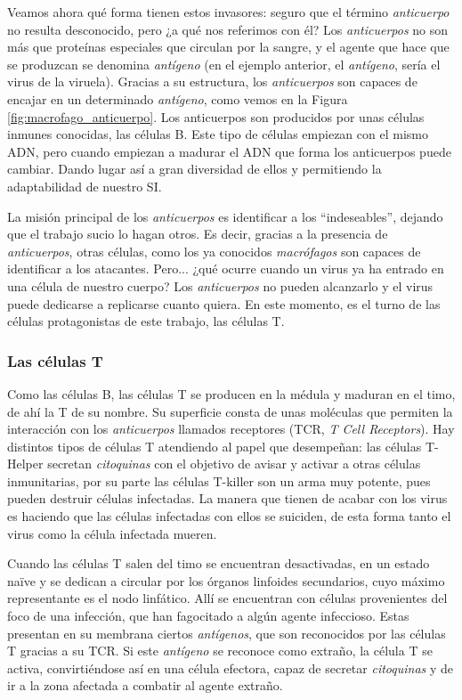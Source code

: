 Veamos ahora qué forma tienen estos invasores: seguro que el término \textit{anticuerpo} no resulta desconocido, pero ¿a qué nos referimos con él? Los \textit{anticuerpos} no son más que proteínas especiales que circulan por la sangre, y el agente que hace que se produzcan se denomina \textit{antígeno} (en el ejemplo anterior, el \textit{antígeno}, sería el virus de la viruela). Gracias a su estructura, los \textit{anticuerpos} son capaces de encajar en un determinado \textit{antígeno}, como vemos en la Figura \ref{fig:macrofago_anticuerpo}. Los anticuerpos son producidos por unas células inmunes conocidas, las células B. Este tipo de células empiezan con el mismo ADN, pero cuando empiezan a madurar el ADN que forma los anticuerpos puede cambiar. Dando lugar así a gran diversidad de ellos y permitiendo la adaptabilidad de nuestro SI.

La misión principal de los \textit{anticuerpos} es identificar a los ``indeseables'', dejando que el trabajo sucio lo hagan otros. Es decir, gracias a la presencia de \textit{anticuerpos}, otras células, como los ya conocidos \textit{macrófagos} son capaces de identificar a los atacantes. Pero... ¿qué ocurre cuando un virus ya ha entrado en una célula de nuestro cuerpo? Los \textit{anticuerpos} no pueden alcanzarlo y el virus puede dedicarse a replicarse cuanto quiera. En este momento, es el turno de las células protagonistas de este trabajo, las células T. 

\subsubsection{Las células T}
Como las células B, las células T se producen en la médula y maduran en el timo, de ahí la T de su nombre. Su superficie consta de unas moléculas que permiten la interacción con los \textit{anticuerpos} llamados receptores (TCR, \textit{T Cell Receptors}). Hay distintos tipos de células T atendiendo al papel que desempeñan: las células T-Helper secretan \textit{citoquinas} con el objetivo de avisar y activar a otras células inmunitarias, por su parte las células T-killer son un arma muy potente, pues pueden destruir células infectadas. La manera que tienen de acabar con los virus es haciendo que las células infectadas con ellos se suiciden, de esta forma tanto el virus como la célula infectada mueren.

Cuando las células T salen del timo se encuentran desactivadas, en un estado naïve y se dedican a circular por los órganos linfoides secundarios, cuyo máximo representante es el nodo linfático. Allí se encuentran con células provenientes del foco de una infección, que han fagocitado a algún agente infeccioso. Estas presentan en su membrana ciertos \textit{antígenos}, que son reconocidos por las células T gracias a su TCR. Si este \textit{antígeno} se reconoce como extraño, la célula T se activa, convirtiéndose así en una célula efectora, capaz de secretar \textit{citoquinas} y de ir a la zona afectada a combatir al agente extraño.



